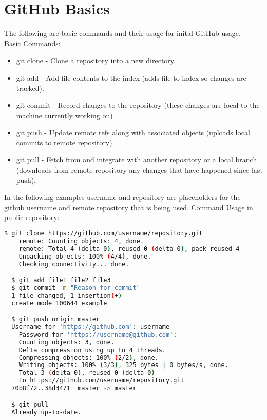 \documentclass[12pt]{article}
\begin{document}
\section*{GitHub Basics}

The following are basic commands and their usage for inital GitHub usage.
\\
Basic Commands:
\begin{itemize}
\item{git clone - Clone a repository into a new directory.}
\item{git add - Add file contents to the index (adds file to index so changes are tracked).}
\item{git commit - Record changes to the repository (these changes are local to the machine currently working on) }
\item{git push - Update remote refs along with associated objects (uploads local commits to remote repository)}
\item{git pull - Fetch from and integrate with another repository or a local branch (downloads from remote repository any changes that have happened since last push). }
\end{itemize}
In the following examples username and repository are placeholders for the github username and remote repository that is being used.
Command Usage in public repository: \\




\begin{lstlisting}[frame=single, language=bash, width=6.5in]
  $ git clone https://github.com/username/repository.git
    remote: Counting objects: 4, done.
    remote: Total 4 (delta 0), reused 0 (delta 0), pack-reused 4
    Unpacking objects: 100% (4/4), done.
    Checking connectivity... done.

  $ git add file1 file2 file3
  $ git commit -m "Reason for commit"
  1 file changed, 1 insertion(+)
  create mode 100644 example

  $ git push origin master
  Username for 'https://github.com': username
	Password for 'https://username@github.com': 
	Counting objects: 3, done.
	Delta compression using up to 4 threads.
	Compressing objects: 100% (2/2), done.
	Writing objects: 100% (3/3), 325 bytes | 0 bytes/s, done.
	Total 3 (delta 0), reused 0 (delta 0)
	To https://github.com/username/repository.git
  70b8f72..38d3471  master -> master

  $ git pull
  Already up-to-date.
\end{lstlisting}
\end{document}
